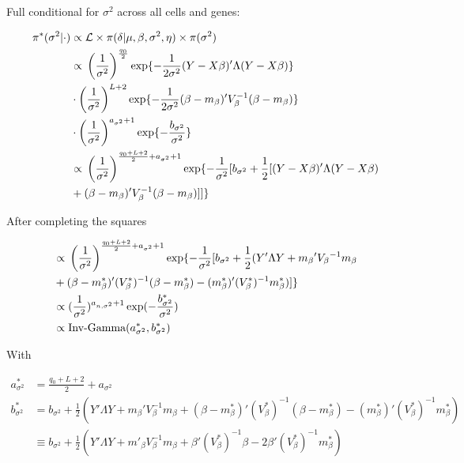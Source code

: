 Full conditional for $\sigma^2$ across all cells and genes:
\begin{fleqn}
\begin{align*}
\pi^*(\sigma^2|\cdot)&\propto{}\mathcal{L}\times\pi(\delta|\mu,\beta,\sigma^2,\eta)\times\pi(\sigma^2)\\
&\propto{}\left(\frac{1}{\sigma^2}\right)^{\frac{q_0}{2}}\exp\lbrace-\frac{1}{2\sigma^2}(Y-X\beta)'\Lambda(Y-X\beta)\rbrace\\
&\cdot\left(\frac{1}{\sigma^2}\right)^{L+2}\exp\lbrace-\frac{1}{2\sigma^2}(\beta-m_\beta{})'V_\beta^{-1}(\beta-m_\beta{})\rbrace\\
&\cdot\left(\frac{1}{\sigma^2}\right)^{a_{\sigma^2}+1}\exp\lbrace-\frac{b_{\sigma^2}}{\sigma^2}\rbrace\\
&\propto{}\left(\frac{1}{\sigma^2}\right)^{\frac{q_0+L+2}{2}+a_{\sigma^2}+1}\exp\lbrace-\frac{1}{\sigma^2}[b_{\sigma^2}+\frac{1}{2}[(Y-X\beta)'\Lambda(Y-X\beta) \\
&+ (\beta-m_\beta{})'V_\beta^{-1}(\beta-m_\beta{})]]\rbrace
\end{align*}
\end{fleqn} 
After completing the squares
\begin{fleqn}
\begin{align*}
&\propto{}\left(\frac{1}{\sigma^2}\right)^{\frac{q_0+L+2}{2}+a_{\sigma^2}+1}\exp\lbrace-\frac{1}{\sigma^2}[b_{\sigma^2}+\frac{1}{2}(Y'\Lambda{}Y+m_\beta{}'V_\beta{}^{-1}m_\beta{}\\
&+(\beta-m^*_{\beta})'(V^*_{\beta})^{-1}(\beta-m^*_{\beta})-(m^*_{\beta})'(V^*_{\beta})^{-1}m^*_{\beta})]\rbrace\\
&\propto{}(\frac{1}{\sigma^2})^{a_{n,\sigma^2}+1}\exp(-\frac{b^*_{\sigma^2}}{\sigma^2})\\
&\propto{}\textnormal{Inv-Gamma}(a^*_{\sigma^2},b^*_{\sigma^2})
\end{align*}
\end{fleqn}
With
\begin{fleqn}
\begin{align*}
a^*_{\sigma^2}&=\frac{q_0+L+2}{2}+a_{\sigma^2}\\
b^*_{\sigma^2}&=b_{\sigma^2}+\frac{1}{2}(Y'\Lambda{}Y+m_\beta'V_\beta^{-1}m_\beta+(\beta-m^*_{\beta})'(V^*_{\beta})^{-1}(\beta-m^*_{\beta})-(m^*_{\beta})'(V^*_{\beta})^{-1}m^*_{\beta})\\
&\equiv{}b_{\sigma^2}+\frac{1}{2}(Y'\Lambda Y+ m'_{\beta} V_\beta^{-1} m_\beta + \beta' (V^*_{\beta})^{-1} \beta - 2 \beta' (V^*_{\beta})^{-1} m^*_{\beta} )
\end{align*}
\end{fleqn}

